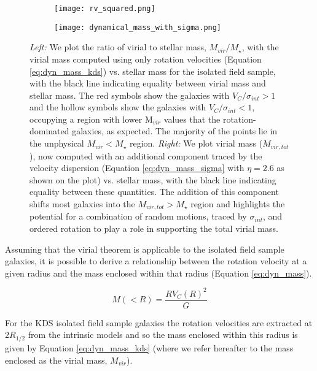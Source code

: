 \documentclass[fleqn,usenatbib]{mnras}
\begin{document}
\begin{figure*}
    \centering \hspace{-1.3cm}
    \begin{subfigure}[h!]{0.5\textwidth}
        \centering
        \texttt{[image: rv\_squared.png]}
    \end{subfigure} \hspace{+0.4cm}
    \begin{subfigure}[h!]{0.5\textwidth}
        \centering
        \texttt{[image: dynamical\_mass\_with\_sigma.png]}
    \end{subfigure}
    \caption{{\it Left:} We plot the ratio of virial to stellar mass, $M_{vir}/M_{\star}$, with the virial mass computed using only rotation velocities (Equation \protect\ref{eq:dyn_mass_kds}) vs. stellar mass for the isolated field sample, with the black line indicating equality between virial mass and stellar mass.
    The red symbols show the galaxies with $V_{C}/\sigma_{int} > 1$ and the hollow symbols show the galaxies with $V_{C}/\sigma_{int} < 1$, occupying a region with lower M$_{vir}$ values that the rotation-dominated galaxies, as expected.
    The majority of the points lie in the unphysical $M_{vir} < M_{\star}$ region.
    {\it Right:} We plot virial mass ($M_{vir,tot}$), now computed with an additional component traced by the velocity dispersion (Equation \protect\ref{eq:dyn_mass_sigma} with $\eta=2.6$ as shown on the plot) vs. stellar mass, with the black line indicating equality between these quantities.
    The addition of this component shifts most galaxies into the $M_{vir,tot} > M_{\star}$ region and highlights the potential for a combination of random motions, traced by $\sigma_{int}$, and ordered rotation to play a role in supporting the total virial mass.}
    \label{fig:dyn_masses}
\end{figure*}

Assuming that the virial theorem is applicable to the isolated field sample galaxies, it is possible to derive a relationship between the rotation velocity at a given radius and the mass enclosed within that radius (Equation \ref{eq:dyn_mass}). 

\begin{equation}\label{eq:dyn_mass}
   M\left(<R\right) = \frac{RV_{C}(R)^{2}}{G}
\end{equation}

\noindent
For the KDS isolated field sample galaxies the rotation velocities are extracted at $2R_{1/2}$ from the intrinsic models and so the mass enclosed within this radius is given by Equation \ref{eq:dyn_mass_kds} (where we refer hereafter to the mass enclosed as the virial mass, $M_{vir}$). 
\end{document}
